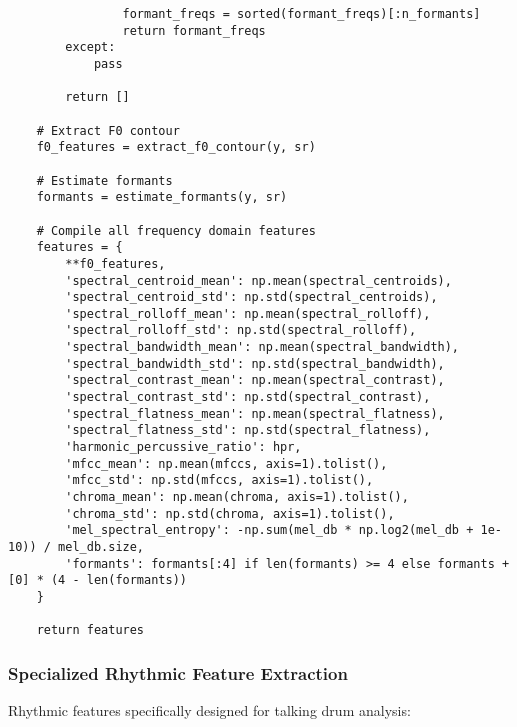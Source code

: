 \documentclass[12pt]{article}
\begin{document}
\begin{verbatim}
                formant_freqs = sorted(formant_freqs)[:n_formants]
                return formant_freqs
        except:
            pass
        
        return []
    
    # Extract F0 contour
    f0_features = extract_f0_contour(y, sr)
    
    # Estimate formants
    formants = estimate_formants(y, sr)
    
    # Compile all frequency domain features
    features = {
        **f0_features,
        'spectral_centroid_mean': np.mean(spectral_centroids),
        'spectral_centroid_std': np.std(spectral_centroids),
        'spectral_rolloff_mean': np.mean(spectral_rolloff),
        'spectral_rolloff_std': np.std(spectral_rolloff),
        'spectral_bandwidth_mean': np.mean(spectral_bandwidth),
        'spectral_bandwidth_std': np.std(spectral_bandwidth),
        'spectral_contrast_mean': np.mean(spectral_contrast),
        'spectral_contrast_std': np.std(spectral_contrast),
        'spectral_flatness_mean': np.mean(spectral_flatness),
        'spectral_flatness_std': np.std(spectral_flatness),
        'harmonic_percussive_ratio': hpr,
        'mfcc_mean': np.mean(mfccs, axis=1).tolist(),
        'mfcc_std': np.std(mfccs, axis=1).tolist(),
        'chroma_mean': np.mean(chroma, axis=1).tolist(),
        'chroma_std': np.std(chroma, axis=1).tolist(),
        'mel_spectral_entropy': -np.sum(mel_db * np.log2(mel_db + 1e-10)) / mel_db.size,
        'formants': formants[:4] if len(formants) >= 4 else formants + [0] * (4 - len(formants))
    }
    
    return features
\end{verbatim}

\subsubsection{Specialized Rhythmic Feature Extraction}
Rhythmic features specifically designed for talking drum analysis:
\end{document}
